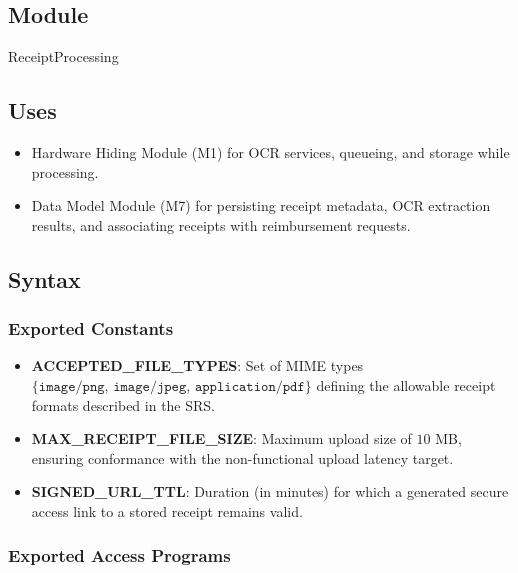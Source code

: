 \documentclass[12pt, titlepage]{article}
\begin{document}
\subsection{Module}

ReceiptProcessing

\subsection{Uses}

\begin{itemize}
  \item Hardware Hiding Module (M1) for OCR services, queueing, and storage while processing.
  \item Data Model Module (M7) for persisting receipt metadata, OCR extraction results, and associating receipts with reimbursement requests.
\end{itemize}

\subsection{Syntax}

\subsubsection{Exported Constants}

\begin{itemize}
  \item \textbf{ACCEPTED\_FILE\_TYPES}: Set of MIME types $\{\texttt{image/png},\, \texttt{image/jpeg},\, \texttt{application/pdf}\}$ defining the allowable receipt formats described in the SRS.
  \item \textbf{MAX\_RECEIPT\_FILE\_SIZE}: Maximum upload size of $10$ MB, ensuring conformance with the non-functional upload latency target.
  \item \textbf{SIGNED\_URL\_TTL}: Duration (in minutes) for which a generated secure access link to a stored receipt remains valid.
\end{itemize}

\subsubsection{Exported Access Programs}
\end{document}
